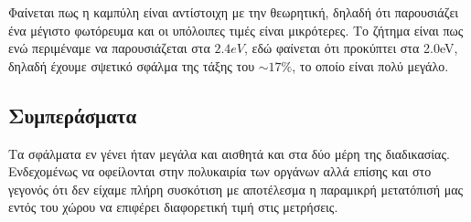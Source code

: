 \documentclass[a4paper]{article}
\begin{document}
			
		Φαίνεται πως η καμπύλη είναι αντίστοιχη με την θεωρητική, δηλαδή ότι παρουσιάζει ένα μέγιστο φωτόρευμα και οι υπόλοιπες τιμές είναι μικρότερες. Το ζήτημα είναι πως ενώ περιμέναμε να παρουσιάζεται στα $2.4eV$, εδώ φαίνεται ότι προκύπτει στα 2.0eV, δηλαδή έχουμε σψετικό σφάλμα της τάξης του $\sim17\%$, το οποίο είναι πολύ μεγάλο.
		
\subsection*{Συμπεράσματα}

		Τα σφάλματα εν γένει ήταν μεγάλα και αισθητά και στα δύο μέρη της διαδικασίας. Ενδεχομένως να οφείλονται στην πολυκαιρία των οργάνων αλλά επίσης και στο γεγονός ότι δεν είχαμε πλήρη συσκότιση με αποτέλεσμα η παραμικρή μετατόπισή μας εντός του χώρου να επιφέρει διαφορετική τιμή στις μετρήσεις.
		
\end{document}
